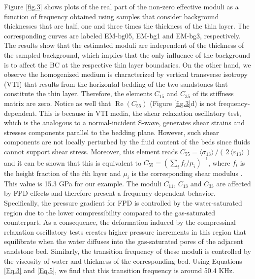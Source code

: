 \documentclass[draft]{agujournal2019}
\renewcommand{\Re}{\operatorname{Re} }
\begin{document}
Figure \ref{fig.3} shows plots of the real part of the non-zero effective moduli as a function of frequency obtained using samples that consider background thicknesses that are half, one and three times the thickness of the thin layer. The corresponding curves are labeled EM-bg05, EM-bg1 and EM-bg3, respectively. The results show that the estimated moduli are independent of the thickness of the sampled background, which implies that the only influence of the background is to affect the BC at the respective thin layer boundaries. 
On the other hand, we observe the homogenized medium is
characterized by vertical transverse isotropy (VTI) that results from the horizontal bedding of the two sandstones that constitute the thin layer. Therefore, the elements $C_{15}$ and $C_{35}$ of its stiffness matrix are zero. Notice as well that $\Re(C_{55})$  (Figure \ref{fig.3}d) is not frequency-dependent. This is because in VTI media, the shear relaxation oscillatory test, which is the analogous to a normal-incident S-wave, generates shear strains and stresses components  parallel to the bedding plane. However, such shear components are not locally perturbed by the fluid content of the beds since fluids cannot support shear stress. Moreover, this element reads $C_{55} = \langle \sigma_{13}\rangle\,/(\,2\, \langle \varepsilon_{13} \rangle\,)$ and it can be shown that this is equivalent to $C_{55}  =\left( \sum_i f_i/\mu_i \right)^{-1}$, where $f_i$ is the height fraction of the $i$th layer and $\mu_i$ is the corresponding shear modulus \cite{Backus1962, Salamon1968}. This value is 15.3 GPa for our example. The moduli  $C_{11}$, $C_{13}$ and $C_{33}$ are affected by FPD effects and therefore present a frequency dependent behavior. Specifically, the pressure gradient for FPD is controlled by the water-saturated region due to the lower compressibility compared to the gas-saturated counterpart. As a consequence, the deformation induced by the compressinal relaxation oscillatory tests creates  higher pressure increments in this region that equilibrate when the water diffuses into the gas-saturated pores of the adjacent sandstone bed. Similarly, the transition frequency of these moduli is controlled by the viscosity of water and thickness of the corresponding bed. Using Equations \eqref{Eq.3} and \eqref{Eq.5}, we find that this transition frequency is around 50.4 KHz.
\end{document}
